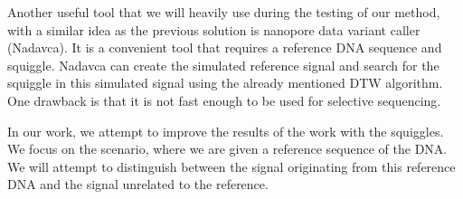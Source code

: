 Another useful tool that we will heavily use during the testing of our method, with a similar idea as the previous solution is
nanopore data variant caller (Nadavca). It is a convenient tool that requires a reference
DNA sequence and squiggle. Nadavca can create the simulated reference signal
and search for the squiggle in this simulated signal using the already mentioned DTW algorithm.
One drawback is that it is not fast enough to be used for selective sequencing.

In our work, we attempt to improve the results of the work with the squiggles.
We focus on the scenario, where we are given a reference sequence of the DNA. We
will attempt to distinguish between the signal originating from this reference DNA and the
signal unrelated to the reference.
